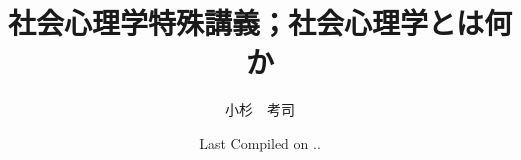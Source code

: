 \documentclass[a5]{ltjsbook}
\begin{document}

\VerbatimFootnotes
\title{社会心理学特殊講義；社会心理学とは何か}
\author{小杉　考司}
\date{Last Compiled on \number\year .\number\month .\number\day}
\maketitle
\setcounter{tocdepth}{1}



\tableofcontents















\printindex[nameidx]
\printindex[termidx]

\printbibliography[title=引用文献]
\end{document}
